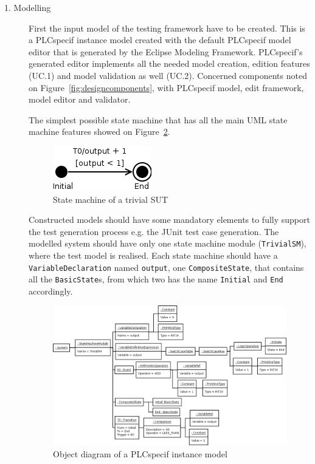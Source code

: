 \begin{description}
	\item[1. Modelling] First the input model of the testing framework have to be created. This is a PLCspecif instance model created with the default PLCspecif model editor that is generated by the Eclipse Modeling Framework. PLCspecif's generated editor implements all the needed model creation, edition features (UC.1) and model validation as well (UC.2). Concerned components noted on Figure~\ref{fig:designcomponents}, with PLCspecif model, edit framework, model editor and validator.
	
	The simplest possible state machine that has all the main UML state machine features showed on Figure~\ref{fig:implementation_model}.
	
\begin{figure}[htp]
\centering
\includegraphics[scale=0.4]{figures/implementation_trivialsm}
\caption{State machine of a trivial SUT}
\label{fig:implementation_trivialsm}
\end{figure}

	Constructed models should have some mandatory elements to fully support the test generation process e.g. the JUnit test case generation. The modelled system should have only one state machine module (\texttt{TrivialSM}), where the test model is realised. Each state machine should have a \texttt{VariableDeclaration} named \texttt{output}, one \texttt{CompositeState}, that contains all the \texttt{BasicState}s, from which two has the name \texttt{Initial} and \texttt{End} accordingly.
	
\begin{figure}[htp]
\centering
\includegraphics[scale=0.4]{figures/implementation_model}
\caption{Object diagram of a PLCspecif instance model}
\label{fig:implementation_model}
\end{figure}
	

\end{description}
